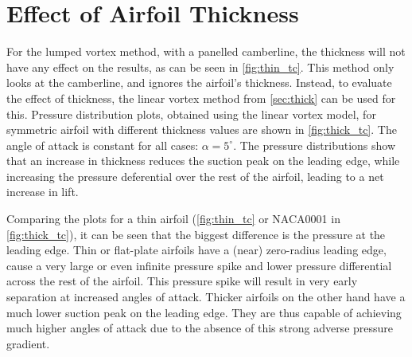 \section{Effect of Airfoil Thickness}
\label{sec:thickness}
For the lumped vortex method, with a panelled camberline, the thickness will not
have any effect on the results, as can be seen in \cref{fig:thin_tc}. This
method only looks at the camberline, and ignores the airfoil's thickness.
Instead, to evaluate the effect of thickness, the linear vortex method from
\autoref{sec:thick} can be used for this. Pressure distribution plots, obtained
using the linear vortex model, for symmetric airfoil with different thickness
values are shown in \cref{fig:thick_tc}.
The angle of attack is constant for all
cases: $\alpha = 5^{\circ}$. The pressure distributions show that an increase in
thickness reduces the suction peak on the leading edge, while increasing the
pressure deferential over the rest of the airfoil, leading to a net increase in
lift.
\medskip

Comparing the plots for a thin airfoil (\cref{fig:thin_tc} or NACA0001 in
\cref{fig:thick_tc}), it can be seen that the biggest difference is the pressure
at the leading edge. Thin or flat-plate airfoils have a (near) zero-radius
leading edge, cause a very large or even infinite pressure spike and lower
pressure differential across the rest of the airfoil. This pressure spike will
result in very early separation at increased angles of attack. Thicker airfoils
on the other hand have a much lower suction peak on the leading edge. They are
thus capable of achieving much higher angles of attack due to the absence of
this strong adverse pressure gradient.

